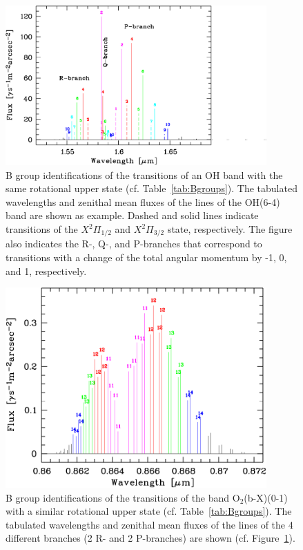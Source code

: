 \begin{figure}
\centering
\includegraphics[width=10cm,clip=true]
{figures/scd_plotohband.pdf}
\caption[]{B group identifications of the transitions of an OH band with the
same rotational upper state (cf. Table~\ref{tab:Bgroups}). The tabulated
wavelengths and zenithal mean fluxes of the lines of the OH(6-4) band are shown
as example. Dashed and solid lines indicate transitions of the $X^2\Pi_{1/2}$ and
$X^2\Pi_{3/2}$ state, respectively. The figure also indicates the R-, Q-, and
P-branches that correspond to transitions with a change of the total angular
momentum by -1, 0, and 1, respectively.}
\label{fig:ohband}
\end{figure}

\begin{figure}
\centering
\includegraphics[width=10cm,clip=true]
{figures/scd_ploto2b01band.pdf}
\caption[]{B group identifications of the transitions of the band
O$_2$(b-X)(0-1) with a similar rotational upper state (cf.
Table~\ref{tab:Bgroups}). The tabulated wavelengths and zenithal mean fluxes of
the lines of the 4 different branches (2 R- and 2 P-branches) are shown (cf.
Figure~\ref{fig:ohband}).}
\label{fig:o2b01band}
\end{figure}

